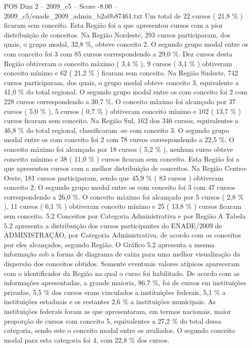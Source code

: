 \begin{textsample}{POS Dim 2 – 2009\_c5 – Score -8.00 – 2009\_c5/enade\_2009\_admin\_b2a0b87461.txt}
Um total de 22 cursos ( 21,8 \% ) ficaram sem conceito.
Esta Região foi a que apresentou cursos com a pior distribuição de conceitos.
Na Região Nordeste, 293 cursos participaram, dos quais, o grupo modal, 32,8 \%, obteve conceito 2.
O segundo grupo modal entre os com conceito foi 3 com 85 cursos correspondendo a 29,0 \%.
Dez cursos desta Região obtiveram o conceito máximo ( 3,4 \% ), 9 cursos ( 3,1 \% ) obtiveram conceito mínimo e 62 ( 21,2 \% ) ficaram sem conceito.
Na Região Sudeste, 742 cursos participaram, dos quais, o grupo modal obteve conceito 3, equivalente a 41,0 \% do total regional.
O segundo grupo modal entre os com conceito foi 2 com 228 cursos correspondendo a 30,7 \%.
O conceito máximo foi alcançado por 37 cursos ( 5,0 \% ), 5 cursos ( 0,7 \% ) obtiveram conceito mínimo e 102 ( 13,7 \% ) cursos ficaram sem conceito.
Na Região Sul, 162 dos 346 cursos, equivalentes a 46,8 \% do total regional, classificaram -se com conceito 3.
O segundo grupo modal entre os com conceito foi 2 com 78 cursos correspondendo a 22,5 \%.
O conceito máximo foi alcançado por 18 cursos ( 5,2 \% ), nenhum curso obteve conceito mínimo e 38 ( 11,0 \% ) cursos ficaram sem conceito.
Esta Região foi a que apresentou cursos com a melhor distribuição de conceitos.
Na Região Centro-Oeste, 181 cursos participaram, sendo que 45,9 \% ( 83 cursos ) obtiveram conceito 2.
O segundo grupo modal entre os com conceito foi 3 com 47 cursos correspondendo a 26,0 \%.
O conceito máximo foi alcançado por 5 cursos ( 2,8 \% ), 11 cursos ( 6,1 \% ) obtiveram conceito mínimo e 25 ( 13,8 \% ) cursos ficaram sem conceito. 5.2 Conceitos por Categoria Administrativa e por Região A Tabela 5.2 apresenta a distribuição dos cursos participantes do ENADE/2009 de ADMINISTRAÇÃO, por Categoria Administrativa, de acordo com os conceitos por eles alcançados, segundo Região.
O Gráfico 5.2 apresenta a mesma informação sob a forma de diagrama de caixa para uma melhor visualização da dispersão dos conceitos obtidos.
Somente eventuais valores atípicos apareceram com o identificador da Região na qual o curso foi habilitado.
De acordo com as informações apresentadas, a grande maioria, 86,7 \%, foi de cursos em instituições privadas, 5,5 \% dos cursos eram vinculados a instituições federais, 5,1 \% a instituições estaduais e os restantes 2,6 \% a instituições municipais.
As instituições federais foram as que apresentaram, em termos nacionais, maior proporção de cursos com conceito 5, equivalentes a 27,2 \% do total dessa categoria, sendo este o conceito modal entre os avaliados.
O segundo conceito modal para esta categoria foi 4, com 22,8 \% dos cursos.

\end{textsample}
